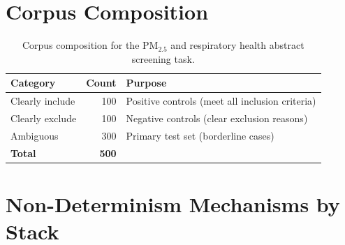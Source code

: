 \documentclass[11pt]{article}
\newenvironment{fittab}{\begin{lrbox}{\fittabbox}}{\end{lrbox}%
  \ifdim\wd\fittabbox>\linewidth\resizebox{\linewidth}{!}{\usebox{\fittabbox}}\else\usebox{\fittabbox}\fi}
\begin{document}
\section{Corpus Composition}

\begin{table}[htbp]
\centering
\caption{Corpus composition for the PM$_{2.5}$ and respiratory health abstract screening task.}
\label{tab:corpus}
\begin{fittab}\begin{tabular}{lrl}
\toprule
\textbf{Category} & \textbf{Count} & \textbf{Purpose} \\
\midrule
Clearly include    & 100   & Positive controls (meet all inclusion criteria) \\
Clearly exclude    & 100   & Negative controls (clear exclusion reasons) \\
Ambiguous          & 300   & Primary test set (borderline cases) \\
\midrule
\textbf{Total}     & \textbf{500} & \\
\bottomrule
\end{tabular}\end{fittab}
\end{table}


\section{Non-Determinism Mechanisms by Stack}
\end{document}
